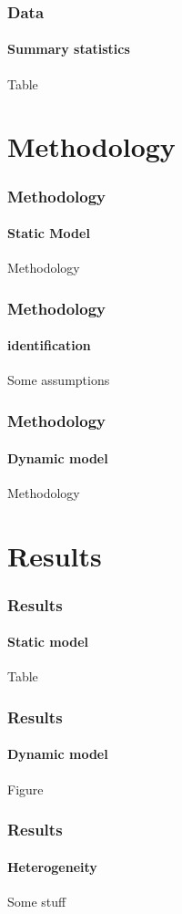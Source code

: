 \documentclass[aspectratio=169]{beamer}
\begin{document}
	\begin{frame}
		\frametitle{Data}
		\framesubtitle{Summary statistics}
		
		Table
		
	\end{frame}

\section[Methodology]{Methodology}

	\begin{frame}
		\frametitle{Methodology}
		\framesubtitle{Static Model}
		
		Methodology
		
	\end{frame}
	
	\begin{frame}
		\frametitle{Methodology}
		\framesubtitle{identification}
	
		Some assumptions
	
	\end{frame}
	
	\begin{frame}
		\frametitle{Methodology}
		\framesubtitle{Dynamic model}
		
		Methodology
		
	\end{frame}

\section[results]{Results}

	\begin{frame}
		\frametitle{Results}
		\framesubtitle{Static model}
		
		Table
		
	\end{frame}
	
	
	\begin{frame}
		\frametitle{Results}
		\framesubtitle{Dynamic model}
		
		Figure
		
	\end{frame}
	
	
	
	\begin{frame}
		\frametitle{Results}
		\framesubtitle{Heterogeneity}
		
		Some stuff
		 
	\end{frame}
	
\end{document}
